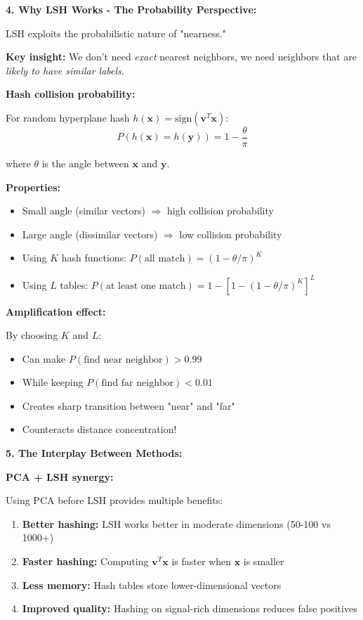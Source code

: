 \documentclass[12pt]{article}
\begin{document}
\begin{explanation}
\textbf{4. Why LSH Works - The Probability Perspective:}

LSH exploits the probabilistic nature of "nearness."

\textbf{Key insight:} We don't need \textit{exact} nearest neighbors, we need neighbors that are \textit{likely to have similar labels}.

\textbf{Hash collision probability:}

For random hyperplane hash \(h(\mathbf{x}) = \text{sign}(\mathbf{v}^T \mathbf{x})\):
\[
P(h(\mathbf{x}) = h(\mathbf{y})) = 1 - \frac{\theta}{\pi}
\]

where \(\theta\) is the angle between \(\mathbf{x}\) and \(\mathbf{y}\).

\textbf{Properties:}
\begin{itemize}
    \item Small angle (similar vectors) \(\Rightarrow\) high collision probability
    \item Large angle (dissimilar vectors) \(\Rightarrow\) low collision probability
    \item Using \(K\) hash functions: \(P(\text{all match}) = (1 - \theta/\pi)^K\)
    \item Using \(L\) tables: \(P(\text{at least one match}) = 1 - [1 - (1-\theta/\pi)^K]^L\)
\end{itemize}

\textbf{Amplification effect:}

By choosing \(K\) and \(L\):
\begin{itemize}
    \item Can make \(P(\text{find near neighbor}) > 0.99\)
    \item While keeping \(P(\text{find far neighbor}) < 0.01\)
    \item Creates sharp transition between "near" and "far"
    \item Counteracts distance concentration!
\end{itemize}

\textbf{5. The Interplay Between Methods:}

\textbf{PCA + LSH synergy:}

Using PCA before LSH provides multiple benefits:
\begin{enumerate}
    \item \textbf{Better hashing:} LSH works better in moderate dimensions (50-100 vs 1000+)
    \item \textbf{Faster hashing:} Computing \(\mathbf{v}^T \mathbf{x}\) is faster when \(\mathbf{x}\) is smaller
    \item \textbf{Less memory:} Hash tables store lower-dimensional vectors
    \item \textbf{Improved quality:} Hashing on signal-rich dimensions reduces false positives
\end{enumerate}


\end{explanation}
\end{document}
